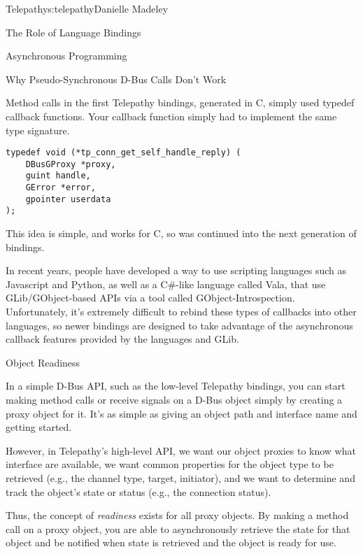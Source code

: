 \begin{aosachapter}{Telepathy}{s:telepathy}{Danielle Madeley}
\begin{aosasect1}{The Role of Language Bindings}
\begin{aosasect2}{Asynchronous Programming}
\begin{aosabox}{Why Pseudo-Synchronous D-Bus Calls Don't Work}
\begin{aosaitemize}
\end{aosaitemize}
\end{aosabox}

Method calls in the first Telepathy bindings, generated in C, simply
used typedef callback functions. Your callback function simply had to
implement the same type signature.

\begin{verbatim}
typedef void (*tp_conn_get_self_handle_reply) (
    DBusGProxy *proxy,
    guint handle,
    GError *error,
    gpointer userdata
);
\end{verbatim}

\noindent This idea is simple, and works for C, so was continued into
the next generation of bindings.

In recent years, people have developed a way to use scripting
languages such as Javascript and Python, as well as a C\#-like
language called Vala, that use GLib/GObject-based APIs via a tool
called GObject-Introspection.  Unfortunately, it's extremely difficult
to rebind these types of callbacks into other languages, so newer
bindings are designed to take advantage of the asynchronous callback
features provided by the languages and GLib.

\end{aosasect2}

\begin{aosasect2}{Object Readiness}
\label{sec.telepathy.readiness}

In a simple D-Bus API, such as the low-level Telepathy bindings, you
can start making method calls or receive signals on a D-Bus object
simply by creating a proxy object for it.  It's as simple as giving an
object path and interface name and getting started.

However, in Telepathy's high-level API, we want our object proxies to
know what interface are available, we want common properties for the
object type to be retrieved (e.g., the channel type, target,
initiator), and we want to determine and track the object's state or
status (e.g., the connection status).

Thus, the concept of \emph{readiness} exists for all proxy objects. By
making a method call on a proxy object, you are able to asynchronously
retrieve the state for that object and be notified when state is
retrieved and the object is ready for use.


\end{aosasect2}
\end{aosasect1}
\end{aosachapter}
